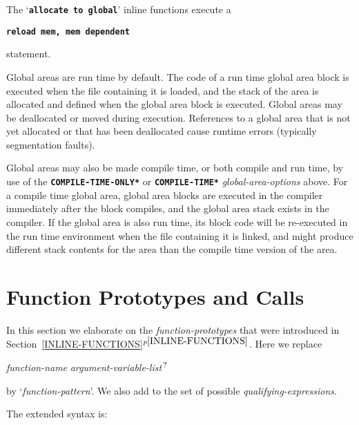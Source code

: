 \documentclass[12pt]{article}
\newcommand{\TT}[1]{{\tt \bfseries #1}}
\newcommand{\itemref}[1]{\ref{#1}$^{p\pageref{#1}}$}
\newcommand{\EOL}{\penalty \exhyphenpenalty}
\newcommand{\QMARK}{{$^{\,\mbox{\footnotesize ?}}$}}
\begin{document}
The `\TT{allocate to global}' inline functions execute a
\begin{center}
\TT{reload mem, mem dependent}
\end{center}
statement.

Global areas are run time by default.
The code of a run time
global area block is executed when the file containing it is
loaded, and the stack of the area is allocated and defined when
the global area block is executed.
Global areas may be deallocated or moved during execution.
References to a global area
that is not yet allocated or that has been deallocated cause runtime
errors (typically segmentation faults).

Global areas may also be made compile time, or both compile and run time,
by use of the \TT{*COM\-PILE-\EOL TIME-\EOL ONLY*} or \TT{*COMPILE-\EOL TIME*}
{\em global-\EOL area-\EOL options} above.  For a compile time
global area, global area blocks are executed in the compiler immediately
after the block compiles, and the global area stack exists in the compiler.
If the global area is also run time, its
block code will be re-executed in the run time environment when the
file containing it is linked, and might produce different stack contents
for the area than the compile time version of the area.

\section{Function Prototypes and Calls}
\label{FUNCTION-PROTOTYPES-AND-CALLS}

In this section we elaborate on the {\em function-prototypes} that were
introduced in Section~\itemref{INLINE-FUNCTIONS}.   Here we replace
\begin{center}
{\em function-name} {\em argument-variable-list}\QMARK{}
\end{center}
by `{\em function-pattern}'.  We also add to the set of possible
{\em qualifying-expressions}.

The extended syntax is:
\end{document}
